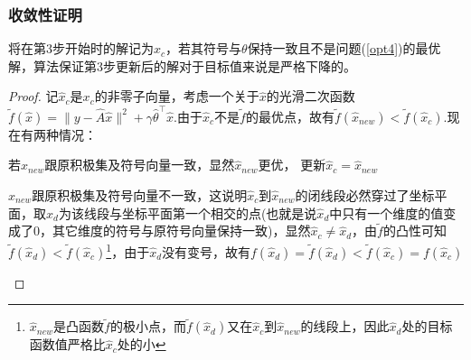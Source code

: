 \subsubsection{收敛性证明}
\begin{lemma}\label{lemma1}
  将在第3步开始时的解记为$x_c$，若其符号与$\theta$保持一致且不是问题(\ref{opt4})的最优解，算法保证第3步更新后的解对于目标值来说是严格下降的。
\end{lemma}
\begin{proof}
  记$\hat{x}_c$是$x_c$的非零子向量，考虑一个关于$\hat{x}$的光滑二次函数$\tilde{f}(\hat{x})=\|y-\hat{A}\hat{x}\|^2+\gamma\hat{\theta}^{\top}\hat{x}$.由于$\hat{x}_c$不是$\tilde{f}$的最优点，故有$\tilde{f}(\hat{x}_{new})<\tilde{f}(\hat{x}_c)$.现在有两种情况：
  \begin{compactenum}
    \item 若$\hat{x}_{new}$跟原积极集及符号向量一致，显然$\hat{x}_{new}$更优， 更新$\hat{x}_c=\hat{x}_{new}$
    \item $\hat{x}_{new}$跟原积极集及符号向量不一致，这说明$\hat{x}_c$到$\hat{x}_{new}$的闭线段必然穿过了坐标平面，取$\hat{x}_d$为该线段与坐标平面第一个相交的点(也就是说$\hat{x}_d$中只有一个维度的值变成了0，其它维度的符号与原符号向量保持一致)，显然$\hat{x}_c\neq\hat{x}_d$，由$\tilde{f}$的凸性可知$\tilde{f}(\hat{x}_d)<\tilde{f}(\hat{x}_c)$\footnote{$\hat{x}_{new}$是凸函数$\tilde{f}$的极小点，而$\tilde{f}(\hat{x} _d)$又在$\hat{x}_c$到$\hat{x}_{new}$的线段上，因此$\hat{x}_d$处的目标函数值严格比$\hat{x}_c$处的小}，由于$\hat{x}_d$没有变号，故有$f(\hat{x}_d)=\tilde{f}(\hat{x}_d)<\tilde{f}(\hat{x}_c)=f(\hat{x}_c)$
  \end{compactenum}
\end{proof}

